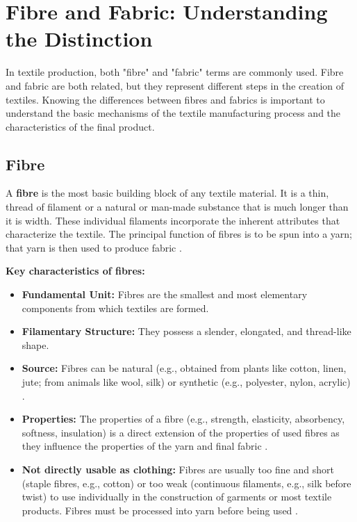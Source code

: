 \section{Fibre and Fabric: Understanding the Distinction}

In textile production, both "fibre" and "fabric" terms are commonly used. Fibre and fabric are both related, but they represent different steps in the creation of textiles. Knowing the differences between fibres and fabrics is important to understand the basic mechanisms of the textile manufacturing process and the characteristics of the final product.

\subsection{Fibre}

A \textbf{fibre} is the most basic building block of any textile material. It is a thin, thread of filament or a natural or man-made substance that is much longer than it is width. These individual filaments incorporate the inherent attributes that characterize the textile. The principal function of fibres is to be spun into a yarn; that yarn is then used to produce fabric \cite{researchgate}.

\textbf{Key characteristics of fibres:}
\begin{itemize}
    \item \textbf{Fundamental Unit:} Fibres are the smallest and most elementary components from which textiles are formed.
    \item \textbf{Filamentary Structure:} They possess a slender, elongated, and thread-like shape.
    \item \textbf{Source:} Fibres can be natural (e.g., obtained from plants like cotton, linen, jute; from animals like wool, silk) or synthetic (e.g., polyester, nylon, acrylic) \cite{researchgate}.
    \item \textbf{Properties:} The properties of a fibre (e.g., strength, elasticity, absorbency, softness, insulation) is a direct extension of the properties of used fibres as they influence the properties of the yarn and final fabric \cite{researchgate}.
    \item \textbf{Not directly usable as clothing:}  Fibres are usually too fine and short (staple fibres, e.g., cotton) or too weak (continuous filaments, e.g., silk before twist) to use individually in the construction of garments or most textile products. Fibres must be processed into yarn before being used \cite{researchgate}.
\end{itemize}

